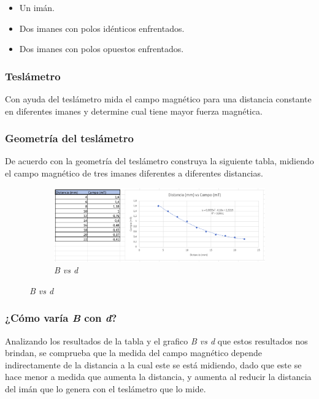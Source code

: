 \begin{itemize}
    \item Un imán.
    \item Dos imanes con polos idénticos enfrentados.
    \item Dos imanes con polos opuestos enfrentados.
\end{itemize}


\subsubsection{Teslámetro}
Con ayuda del teslámetro mida el campo magnético para una distancia constante en
diferentes imanes y determine cual tiene mayor fuerza magnética.


\subsubsection{Geometría del teslámetro}
De acuerdo con la geometría del teslámetro construya la siguiente tabla,
midiendo el campo magnético de tres imanes diferentes a diferentes distancias.

\begin{figure}[H]
    \centering
    \begin{subfigure}[b]{0.8\textwidth}
        \centering
        \includegraphics[width=\textwidth]{Figures/0. General/1.5.png}
        \caption{\textit{B vs d}}
        \label{fig: style 1 B vs d}
    \end{subfigure}
\end{figure}


\subsubsection{¿Cómo varía \textit{B} con \textit{d}?}
Analizando los resultados de la tabla y el grafico \textit{B vs d} que estos
resultados nos brindan, se comprueba que la medida del campo magnético depende
indirectamente de la distancia a la cual este se está midiendo, dado que este se
hace menor a medida que aumenta la distancia, y aumenta al reducir la distancia
del imán que lo genera con el teslámetro que lo mide.


